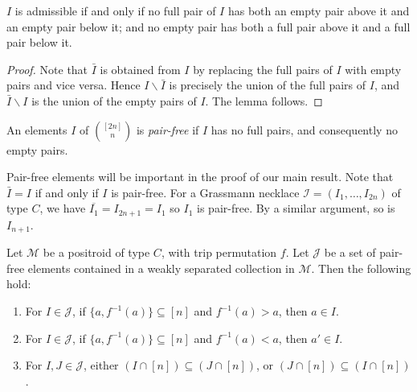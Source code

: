 \documentclass[ALCO,ThmDefs,Unicode,epreuves]{cedram}
\begin{document}
\begin{lemm}
$I$ is admissible if and only if no full pair of $I$ has both an empty pair above it and an empty pair below it; and no empty pair has both a full pair above it and a full pair below it. 
\end{lemm}

\begin{proof}
Note that $\bar{I}$ is obtained from $I$ by replacing the full pairs of $I$ with empty pairs and vice versa. Hence $I \backslash \bar{I}$ is precisely the union of the full pairs of $I$, and $\bar{I} \backslash I$ is the union of the empty pairs of $I$. The lemma follows. \end{proof}

\begin{defi}An elements $I$ of $\binom{[2n]}{n}$ is \emph{pair-free} if $I$ has no full pairs, and consequently no empty pairs. 
\end{defi}

\begin{rema}
\label{I1_is_pair_free}
Pair-free elements will be important in the proof of our main result. Note that $\bar{I} = I$ if and only if $I$ is pair-free. For a Grassmann necklace $\mathcal{I}=(I_1,\ldots,I_{2n})$ of type $C$, we have $\overline{I_1} = I_{2n + 1} = I_1$
so $I_1$ is pair-free. 
By a similar argument, so is $I_{n + 1}.$
\end{rema}

\begin{lemm}\label{pairless}Let $\mathcal{M}$ be a positroid of type $C$, with trip permutation $f$. Let $\mathcal{J}$ be a set of pair-free elements contained in a weakly separated collection in $\mathcal{M}$. Then the following hold:
\begin{enumerate}
\item\label{lemm4.6_1} For $I \in \mathcal{J}$, if $\{a, f^{-1}(a)\} \subseteq [n]$ and $f^{-1}(a) > a$, then $a \in I$.
\item\label{lemm4.6_2} For $I \in \mathcal{J}$, if $\{a,f^{-1}(a)\} \subseteq [n]$ and $f^{-1}(a) < a$, then $a' \in I$.
\item\label{lemm4.6_3} For $I, J \in \mathcal{J}$, either $(I \cap [n]) \subseteq (J \cap [n])$, or $(J \cap [n]) \subseteq (I \cap [n])$.
\end{enumerate}
\end{lemm}
\end{document}
